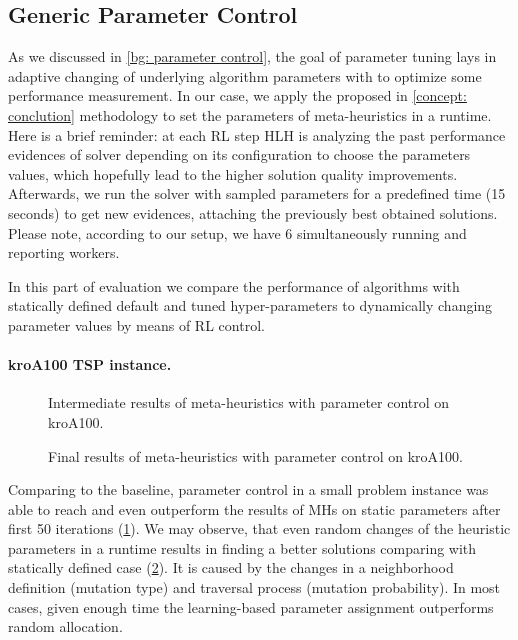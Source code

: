 \subsection{Generic Parameter Control}\label{eval:1:PC}
As we discussed in \cref{bg: parameter control}, the goal of parameter tuning lays in adaptive changing of underlying algorithm parameters with to optimize some performance measurement. In our case, we apply the proposed in \cref{concept: conclution} methodology to set the parameters of meta-heuristics in a runtime. Here is a brief reminder: at each RL step HLH is analyzing the past performance evidences of solver depending on its configuration to choose the parameters values, which hopefully lead to the higher solution quality improvements. Afterwards, we run the solver with sampled parameters for a predefined time (15 seconds) to get new evidences, attaching the previously best obtained solutions. Please note, according to our setup, we have 6 simultaneously running and reporting workers.

In this part of evaluation we compare the performance of algorithms with statically defined default and tuned hyper-parameters to dynamically changing parameter values by means of RL control.

\paragraph{kroA100 TSP instance.}
\begin{figure}[t]
	\centering
	\vspace{-20pt}
	
	\caption{Intermediate results of meta-heuristics with parameter control on kroA100.}
	\vspace{-5pt}
	\label{eval:pict:pc:kroA100 intermediate}
\end{figure}
\begin{figure}[b]
	\centering
	\vspace{-20pt}
	
	\caption{Final results of meta-heuristics with parameter control on kroA100.}
	\vspace{-5pt}
	\label{eval:pict:pc:kroA100 final}
\end{figure}

Comparing to the baseline, parameter control in a small problem instance was able to reach and even outperform the results of MHs on static parameters after first 50 iterations (\cref{eval:pict:pc:kroA100 intermediate}). We may observe, that even random changes of the heuristic parameters in a runtime results in finding a better solutions comparing with statically defined case (\cref{eval:pict:pc:kroA100 final}). It is caused by the changes in a neighborhood definition (mutation type) and traversal process (mutation probability). In most cases, given enough time the learning-based parameter assignment outperforms random allocation.

